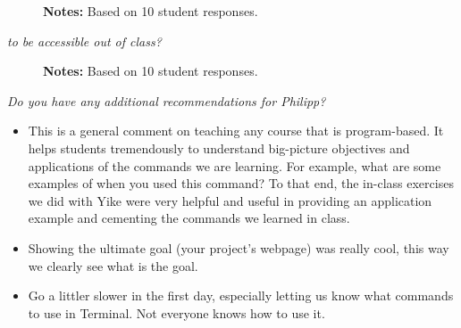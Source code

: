 \begin{boenumerate}
\begin{itemize}
\begin{figure}[h!]\centering
{}\hspace{0.5cm}
\begin{center}
\begin{minipage}[t]{0.85\columnwidth}\vspace{-0.75cm}
\item\scriptsize{\textbf{Notes:} Based on 10 student responses.}
\end{minipage}
\end{center}
\end{figure}
\FloatBarrier
\newpage

\item \textit{to be accessible out of class?}

\begin{figure}[h!]\centering
{}\hspace{0.5cm}
\begin{center}
\begin{minipage}[t]{0.85\columnwidth}\vspace{-0.75cm}
\item\scriptsize{\textbf{Notes:} Based on 10 student responses.}
\end{minipage}
\end{center}
\end{figure}
\FloatBarrier


\end{itemize}



\item \textit{Do you have any additional recommendations for Philipp?}
\begin{itemize}
\item This is a general comment on teaching any course that is program-based. It helps students tremendously to understand big-picture objectives and applications of the commands we are learning. For example, what are some examples of when you used this command? To that end, the in-class exercises we did with Yike were very helpful and useful in providing an application example and cementing the commands we learned in class.
\item Showing the ultimate goal (your project's webpage) was really cool, this way we clearly see what is the goal.
\item Go a littler slower in the first day, especially letting us know what commands to use in Terminal. Not everyone knows how to use it.
\end{itemize}



\end{boenumerate}

